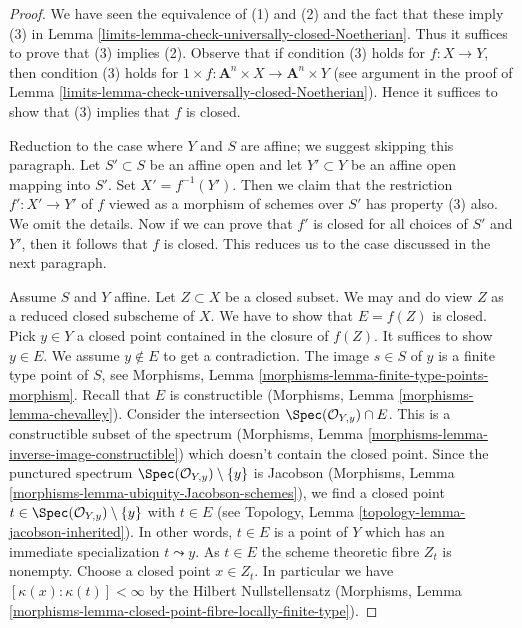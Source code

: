 \begin{proof}

We have seen the equivalence of (1) and (2) and the
fact that these imply (3) in
Lemma \ref{limits-lemma-check-universally-closed-Noetherian}.
Thus it suffices to prove that (3) implies (2).
Observe that if condition (3) holds for $f : X \to Y$,
then condition (3) holds for
$1 \times f : \mathbf{A}^n \times X \to \mathbf{A}^n \times Y$
(see argument in the proof of
Lemma \ref{limits-lemma-check-universally-closed-Noetherian}).
Hence it suffices to show that (3) implies that $f$ is closed.

\medskip\noindent
Reduction to the case where $Y$ and $S$ are affine; we suggest
skipping this paragraph.
Let $S' \subset S$ be an affine open and let $Y' \subset Y$ be an
affine open mapping into $S'$. Set $X' = f^{-1}(Y')$. Then we
claim that the restriction $f' : X' \to Y'$ of $f$ viewed as a morphism
of schemes over $S'$ has property (3) also. We omit the details.
Now if we can prove that $f'$ is closed for all choices of
$S'$ and $Y'$, then it follows that $f$ is closed. This reduces
us to the case discussed in the next paragraph.

\medskip\noindent
Assume $S$ and $Y$ affine. Let $Z \subset X$ be a closed subset.
We may and do view $Z$ as a reduced closed subscheme of $X$.
We have to show that $E = f(Z)$ is closed. Pick $y \in Y$ a closed point
contained in the closure of $f(Z)$. It suffices to show $y \in E$.
We assume $y \not \in E$ to get a contradiction.
The image $s \in S$ of $y$ is a finite type point of $S$, see
Morphisms, Lemma \ref{morphisms-lemma-finite-type-points-morphism}.
Recall that $E$ is constructible
(Morphisms, Lemma \ref{morphisms-lemma-chevalley}).
Consider the intersection $\Spec(\mathcal{O}_{Y, y}) \cap E$.
This is a constructible subset of the spectrum
(Morphisms, Lemma \ref{morphisms-lemma-inverse-image-constructible})
which doesn't contain the closed point.
Since the punctured spectrum
$\Spec(\mathcal{O}_{Y, y}) \setminus \{y\}$ is Jacobson
(Morphisms, Lemma \ref{morphisms-lemma-ubiquity-Jacobson-schemes}), we find a
closed point $t \in \Spec(\mathcal{O}_{Y, y}) \setminus \{y\}$
with $t \in E$ (see Topology, Lemma \ref{topology-lemma-jacobson-inherited}).
In other words, $t \in E$ is a point of $Y$ which
has an immediate specialization $t \leadsto y$.
As $t \in E$ the scheme theoretic fibre $Z_t$ is nonempty.
Choose a closed point $x \in Z_t$. In particular we have
$[\kappa(x) : \kappa(t)] < \infty$ by the Hilbert Nullstellensatz
(Morphisms, Lemma
\ref{morphisms-lemma-closed-point-fibre-locally-finite-type}).


\end{proof}
